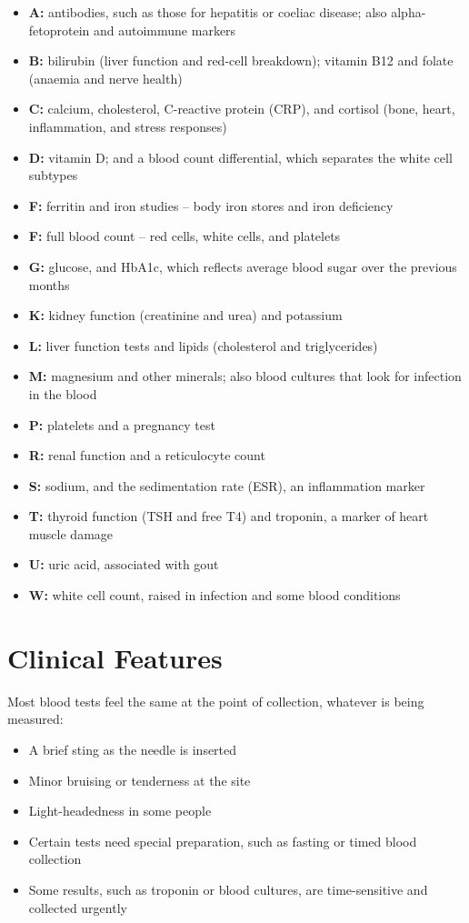 \begin{itemize}
    \item \textbf{A:} antibodies, such as those for hepatitis or coeliac disease; also alpha-fetoprotein and autoimmune markers
    \item \textbf{B:} bilirubin (liver function and red-cell breakdown); vitamin B12 and folate (anaemia and nerve health)
    \item \textbf{C:} calcium, cholesterol, C-reactive protein (CRP), and cortisol (bone, heart, inflammation, and stress responses)
    \item \textbf{D:} vitamin D; and a blood count differential, which separates the white cell subtypes
    \item \textbf{F:} ferritin and iron studies -- body iron stores and iron deficiency
    \item \textbf{F:} full blood count -- red cells, white cells, and platelets
    \item \textbf{G:} glucose, and HbA1c, which reflects average blood sugar over the previous months
    \item \textbf{K:} kidney function (creatinine and urea) and potassium
    \item \textbf{L:} liver function tests and lipids (cholesterol and triglycerides)
    \item \textbf{M:} magnesium and other minerals; also blood cultures that look for infection in the blood
    \item \textbf{P:} platelets and a pregnancy test
    \item \textbf{R:} renal function and a reticulocyte count
    \item \textbf{S:} sodium, and the sedimentation rate (ESR), an inflammation marker
    \item \textbf{T:} thyroid function (TSH and free T4) and troponin, a marker of heart muscle damage
    \item \textbf{U:} uric acid, associated with gout
    \item \textbf{W:} white cell count, raised in infection and some blood conditions
\end{itemize}

\section*{Clinical Features}
Most blood tests feel the same at the point of collection, whatever is being measured:

\begin{itemize}
    \item A brief sting as the needle is inserted
    \item Minor bruising or tenderness at the site
    \item Light-headedness in some people
    \item Certain tests need special preparation, such as fasting or timed blood collection
    \item Some results, such as troponin or blood cultures, are time-sensitive and collected urgently
\end{itemize}

